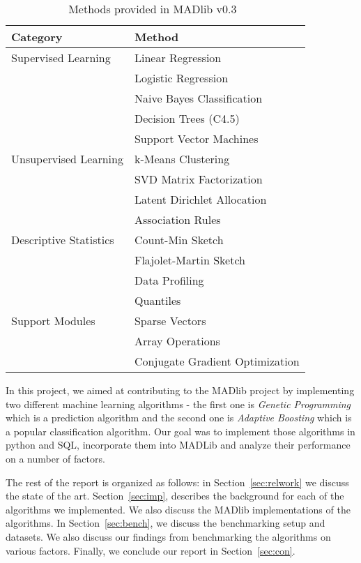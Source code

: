 \begin{table}[!ht]
\centering
\begin{tabular}{|l|l|}
\hline
Category & Method\\
\hline
Supervised Learning & Linear Regression\\
& Logistic Regression\\
& Naive Bayes Classification\\
& Decision Trees (C4.5)\\
& Support Vector Machines\\
\hline
Unsupervised Learning & k-Means Clustering\\
& SVD Matrix Factorization\\
& Latent Dirichlet Allocation\\
& Association Rules\\
\hline
Descriptive Statistics & Count-Min Sketch\\
& Flajolet-Martin Sketch\\
& Data Profiling\\
& Quantiles\\
\hline
Support Modules & Sparse Vectors\\
& Array Operations\\
& Conjugate Gradient Optimization\\
\hline
\end{tabular}
\caption{Methods provided in MADlib v0.3~\cite{madlib12}}
\label{tab:mad}
\end{table}

In this project, we aimed at contributing to the MADlib project by implementing two different machine learning algorithms - the first one is {\itshape Genetic Programming} which is a prediction algorithm and the second one is {\itshape Adaptive Boosting} which is a popular classification algorithm. Our goal was to implement those algorithms in python and SQL, incorporate them into MADLib and analyze their performance on a number of factors.

The rest of the report is organized as follows: in Section~\ref{sec:relwork} we discuss the state of the art. Section~\ref{sec:imp}, describes the background for each of the algorithms we implemented. We also discuss the MADlib implementations of the algorithms. In Section~\ref{sec:bench}, we discuss the benchmarking setup and datasets. We also discuss our findings from benchmarking the algorithms on various factors. Finally, we conclude our report in Section~\ref{sec:con}.
